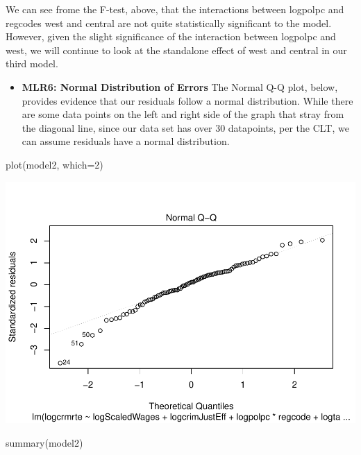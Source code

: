 \documentclass[]{article}
\newenvironment{Shaded}{}{}
\newcommand{\DataTypeTok}[1]{#1}
\newcommand{\DecValTok}[1]{#1}
\newcommand{\KeywordTok}[1]{\textcolor[rgb]{0.00,0.00,1.00}{#1}}
\newcommand{\NormalTok}[1]{#1}
\providecommand{\tightlist}{%
  \setlength{\itemsep}{0pt}\setlength{\parskip}{0pt}}
\begin{document}
We can see frome the F-test, above, that the interactions between
logpolpc and regcodes west and central are not quite statistically
significant to the model. However, given the slight significance of the
interaction between logpolpc and west, we will continue to look at the
standalone effect of west and central in our third model.

\begin{itemize}
\tightlist
\item
  \textbf{MLR6: Normal Distribution of Errors} The Normal Q-Q plot,
  below, provides evidence that our residuals follow a normal
  distribution. While there are some data points on the left and right
  side of the graph that stray from the diagonal line, since our data
  set has over 30 datapoints, per the CLT, we can assume residuals have
  a normal distribution.
\end{itemize}

\begin{Shaded}
\begin{Highlighting}[]
\KeywordTok{plot}\NormalTok{(model2, }\DataTypeTok{which=}\DecValTok{2}\NormalTok{)}
\end{Highlighting}
\end{Shaded}

\includegraphics{Bagnard_Gaustad_Hartman_Leung_Lab_3_files/figure-latex/unnamed-chunk-76-1.pdf}

\begin{Shaded}
\begin{Highlighting}[]
\KeywordTok{summary}\NormalTok{(model2)}
\end{Highlighting}
\end{Shaded}
\end{document}
